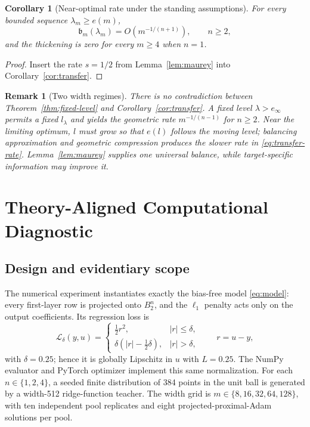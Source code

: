 \documentclass[pdflatex,sn-mathphys-num]{sn-jnl}
\theoremstyle{thmstyleone}
\newtheorem{corollary}[theorem]{Corollary}
\theoremstyle{thmstyletwo}
\newtheorem{remark}[theorem]{Remark}
\theoremstyle{thmstylethree}
\newcommand{\abs}[1]{\left\lvert #1 \right\rvert}
\newcommand{\SubBar}{\mathfrak b}
\begin{document}
\begin{corollary}[Near-optimal rate under the standing assumptions]\label{cor:near-optimal}
For every bounded sequence $\lambda_m\ge e(m)$,
\[
\SubBar_m(\lambda_m)=O(m^{-1/(n+1)}),
\qquad n\ge2,
\]
and the thickening is zero for every $m\ge4$ when $n=1$.
\end{corollary}

\begin{proof}
Insert the rate $s=1/2$ from Lemma~\ref{lem:maurey} into Corollary~\ref{cor:transfer}.
\end{proof}

\begin{remark}[Two width regimes]
There is no contradiction between Theorem~\ref{thm:fixed-level} and Corollary~\ref{cor:transfer}. A fixed level $\lambda>e_\infty$ permits a fixed $l_\lambda$ and yields the geometric rate $m^{-1/(n-1)}$ for $n\ge2$. Near the limiting optimum, $l$ must grow so that $e(l)$ follows the moving level; balancing approximation and geometric compression produces the slower rate in \eqref{eq:transfer-rate}. Lemma~\ref{lem:maurey} supplies one universal balance, while target-specific information may improve it.
\end{remark}

\section{Theory-Aligned Computational Diagnostic}\label{sec:computational}

\subsection{Design and evidentiary scope}

The numerical experiment instantiates exactly the bias-free model \eqref{eq:model}: every first-layer row is projected onto $B_2^n$, and the $\ell_1$ penalty acts only on the output coefficients. Its regression loss is
\[
\mathcal L_\delta(y,u)=
\begin{cases}\frac12r^2,&\abs{r}\le\delta,\\
\delta(\abs{r}-\frac12\delta),&\abs{r}>\delta,
\end{cases}
\qquad r=u-y,
\]
with $\delta=0.25$; hence it is globally Lipschitz in $u$ with $L=0.25$. The NumPy evaluator and PyTorch optimizer implement this same normalization. For each $n\in\{1,2,4\}$, a seeded finite distribution of 384 points in the unit ball is generated by a width-512 ridge-function teacher. The width grid is $m\in\{8,16,32,64,128\}$, with ten independent pool replicates and eight projected-proximal-Adam solutions per pool.
\end{document}
